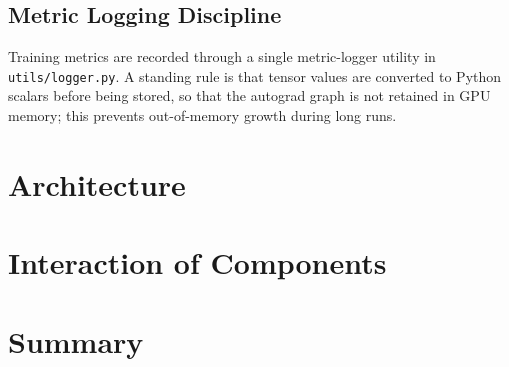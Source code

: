 \subsection{Metric Logging Discipline}
\label{sec:impl-design-logging}

Training metrics are recorded through a single metric-logger utility in
\texttt{utils/logger.py}. A standing rule is that tensor values are converted to Python
scalars before being stored, so that the autograd graph is not retained in GPU memory; this
prevents out-of-memory growth during long runs.

\section{Architecture}

\section{Interaction of Components}

\section{Summary}